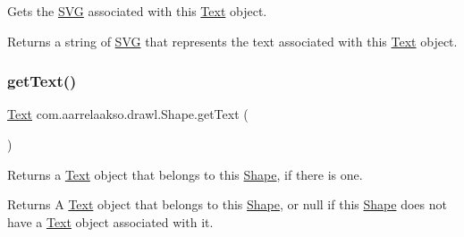Gets the \hyperlink{classcom_1_1aarrelaakso_1_1drawl_1_1_s_v_g}{S\+VG} associated with this \hyperlink{classcom_1_1aarrelaakso_1_1drawl_1_1_text}{Text} object. 

\begin{DoxyReturn}{Returns}
a string of \hyperlink{classcom_1_1aarrelaakso_1_1drawl_1_1_s_v_g}{S\+VG} that represents the text associated with this \hyperlink{classcom_1_1aarrelaakso_1_1drawl_1_1_text}{Text} object. 
\end{DoxyReturn}
\mbox{\label{classcom_1_1aarrelaakso_1_1drawl_1_1_shape_a6f876978d4102974fedc5b41c93c7b26}} 
\subsubsection{\texorpdfstring{get\+Text()}{getText()}}
{\footnotesize\ttfamily \hyperlink{classcom_1_1aarrelaakso_1_1drawl_1_1_text}{Text} com.\+aarrelaakso.\+drawl.\+Shape.\+get\+Text (\begin{DoxyParamCaption}{ }\end{DoxyParamCaption})\hspace{0.3cm}{\ttfamily [inherited]}}



Returns a \hyperlink{classcom_1_1aarrelaakso_1_1drawl_1_1_text}{Text} object that belongs to this \hyperlink{classcom_1_1aarrelaakso_1_1drawl_1_1_shape}{Shape}, if there is one. 

\begin{DoxyReturn}{Returns}
A \hyperlink{classcom_1_1aarrelaakso_1_1drawl_1_1_text}{Text} object that belongs to this \hyperlink{classcom_1_1aarrelaakso_1_1drawl_1_1_shape}{Shape}, or {\ttfamily null} if this \hyperlink{classcom_1_1aarrelaakso_1_1drawl_1_1_shape}{Shape} does not have a \hyperlink{classcom_1_1aarrelaakso_1_1drawl_1_1_text}{Text} object associated with it. 
\end{DoxyReturn}
\mbox{\label{classcom_1_1aarrelaakso_1_1drawl_1_1_shape_aed4e9caa294aacc973b7a531a960e9e5}} 
